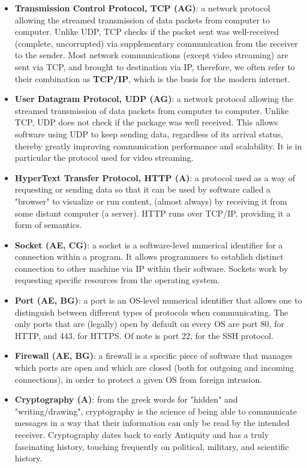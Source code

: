\documentclass{article}
\begin{document}
\begin{itemize}
	\item \textbf{Transmission Control Protocol, TCP (AG)}: a network protocol allowing the streamed transmission of data packets from computer to computer. Unlike UDP, TCP checks if the packet sent was well-received (complete, uncorrupted) via supplementary communication from the receiver to the sender. Most network communications (except video streaming) are sent via TCP, and brought to destination via IP, therefore, we often refer to their combination as \textbf{TCP/IP}, which is the basis for the modern internet.

	\item \textbf{User Datagram Protocol, UDP (AG)}: a network protocol allowing the streamed transmission of data packets from computer to computer. Unlike TCP, UDP does not check if the package was well received. This allows software using UDP to keep sending data, regardless of its arrival status, thereby greatly improving communication performance and scalability. It is in particular the protocol used for video streaming.

	\item \textbf{HyperText Transfer Protocol, HTTP (A)}: a protocol used as a way of requesting or sending data so that it can be used by software called a "browser" to visualize or run content, (almost always) by receiving it from some distant computer (a server). HTTP runs over TCP/IP, providing it a form of semantics.

	\item \textbf{Socket (AE, CG)}: a socket is a software-level numerical identifier for a connection within a program. It allows programmers to establish distinct connection to other machine via IP within their software. Sockets work by requesting specific resources from the operating system.

	\item \textbf{Port (AE, BG)}: a port is an OS-level numerical identifier that allows one to distinguish between different types of protocols when communicating. The only ports that are (legally) open by default on every OS are port 80, for HTTP, and 443, for HTTPS. Of note is port 22, for the SSH protocol.

	\item \textbf{Firewall (AE, BG)}: a firewall is a specific piece of software that manages which ports are open and which are closed (both for outgoing and incoming connections), in order to protect a given OS from foreign intrusion.

	\item \textbf{Cryptography (A)}: from the greek words for "hidden" and "writing/drawing", cryptography is the science of being able to communicate messages in a way that their information can only be read by the intended receiver. Cryptography dates back to early Antiquity and has a truly fascinating history, touching frequently on political, military, and scientific history. 


\end{itemize}
\end{document}
